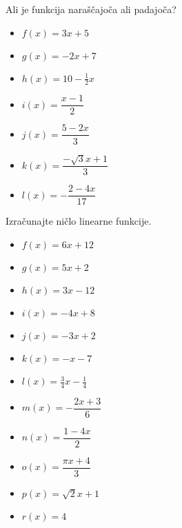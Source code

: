         
            \begin{naloga}
                Ali je funkcija naraščajoča ali padajoča?
                \begin{multicols}{2}
                    \begin{itemize}
                        \item $f(x)=3x+5$ 
                        \item $g(x)=-2x+7$ 
                        \item $h(x)=10-\frac{1}{2}x$ 
                        \item $i(x)=\dfrac{x-1}{2}$ 
                        \item $j(x)=\dfrac{5-2x}{3}$ 
                        \item $k(x)=\dfrac{-\sqrt{3}x+1}{3}$ 
                        \item $l(x)=-\dfrac{2-4x}{17}$ 
                    \end{itemize}
                \end{multicols}
            \end{naloga}
        


        
            \begin{naloga}
                Izračunajte ničlo linearne funkcije.
                \begin{multicols}{2}
                    \begin{itemize}
                        \item $f(x)=6x+12$ 
                        \item $g(x)=5x+2$ 
                        \item $h(x)=3x-12$ 
                        \item $i(x)=-4x+8$ 
                        \item $j(x)=-3x+2$ 
                        \item $k(x)=-x-7$ 
                        \item $l(x)=\frac{3}{4}x-\frac{1}{4}$ 
                        \item $m(x)=-\dfrac{2x+3}{6}$ 
                        \item $n(x)=\dfrac{1-4x}{2}$ 
                        \item $o(x)=\dfrac{\pi x+4}{3}$ 
                        \item $p(x)=\sqrt{2}x+1$ 
                        \item $r(x)=4$ 
                    \end{itemize}
                \end{multicols}
            \end{naloga}
        


